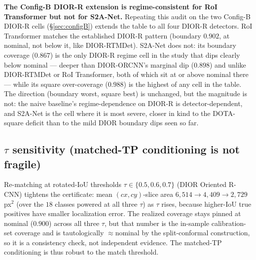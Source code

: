 \documentclass[journal]{IEEEtran}
\begin{document}
\textbf{The Config-B DIOR-R extension is regime-consistent for RoI Transformer but not for S2A-Net.}
Repeating this audit on the two Config-B DIOR-R cells (\S\ref{sec:configB}) extends the table to all four
DIOR-R detectors. RoI Transformer matches the established DIOR-R pattern (boundary $0.902$, at nominal, not
below it, like DIOR-RTMDet). S2A-Net does not: its boundary coverage ($0.867$) is the only DIOR-R regime cell
in the study that dips clearly below nominal --- deeper than DIOR-ORCNN's marginal dip ($0.898$) and unlike
DIOR-RTMDet or RoI Transformer, both of which sit at or above nominal there --- while its square
over-coverage ($0.988$) is the highest of any cell in the table. The direction (boundary worst, square best)
is unchanged, but the magnitude is not: the naive baseline's regime-dependence on DIOR-R is
detector-dependent, and S2A-Net is the cell where it is most severe, closer in kind to the DOTA-square
deficit than to the mild DIOR boundary dips seen so far.

\subsection{$\tau$ sensitivity (matched-TP conditioning is not fragile)}
Re-matching at rotated-IoU thresholds $\tau\in\{0.5,0.6,0.7\}$ (DIOR Oriented R-CNN) tightens the
certificate: mean $(cx,cy)$-slice area $6{,}514\to4{,}409\to2{,}729$\,px$^2$ (over the $18$ classes
powered at all three $\tau$) as $\tau$ rises, because higher-IoU true positives have smaller localization
error. The realized coverage stays pinned at nominal ($0.900$) across all three $\tau$, but that number is
the in-sample calibration-set coverage and is tautologically $\approx$nominal by the split-conformal
construction, so it is a consistency check, not independent evidence. The matched-TP conditioning is thus
robust to the match threshold.
\end{document}
